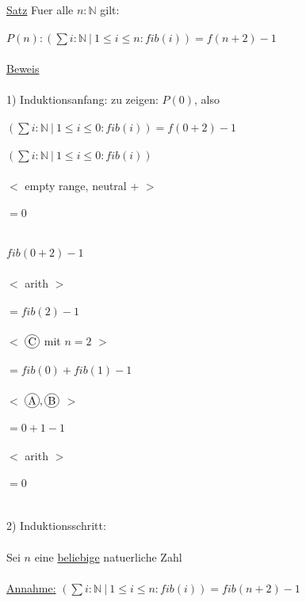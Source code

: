 \documentclass[18pt,a4paper]{article}
\newcommand*\circled[1]{\tikz[baseline=(char.base)]{
            \node[shape=circle,draw,inner sep=1pt] (char) {#1};}}
\newcommand{\tab}{\hspace*{2em}}
\begin{document}
\\
\\
\uline{Satz} Fuer alle $n : \mathbb{N}$ gilt: \\
\\
$P(n): (\sum{i} : \mathbb{N} \:\vert\: 1\leqslant i\leqslant n : fib(i)) = f(n+2) -1$\\
\\
\uline{Beweis}\\
\\
1) Induktionsanfang: zu zeigen: $P(0)$, also\\
\\
$(\sum{i} : \mathbb{N} \:\vert\: 1\leqslant i\leqslant 0 : fib(i)) = f(0+2) -1$\\
\\
$(\sum{i} : \mathbb{N} \:\vert\: 1\leqslant i\leqslant 0 : fib(i))$\\
\\
\tab $<$ empty range, neutral + $>$\\
\\
$=0$\\
\\
\\
$fib(0+2) -1$\\
\\
\tab $<$ arith $>$\\
\\
$= fib(2) -1$\\
\\
\tab $<$ $\circled{C}$ mit $n=2$ $>$\\
\\
$= fib(0) + fib(1) -1$\\
\\
\tab $<$ $\circled{A}, \circled{B}$ $>$ \\
\\
$= 0 +1 -1$\\
\\
\tab $<$ arith $>$ \\
\\
$ =0$\\
\\
\\
2) Induktionsschritt: \\
\\
Sei $n$ eine \uline{beliebige} natuerliche Zahl\\
\\
\uline{Annahme:} $(\sum{i} : \mathbb{N} \:\vert\: 1\leqslant i\leqslant n : fib(i)) = fib(n+2) -1$\\
\\
\end{document}
